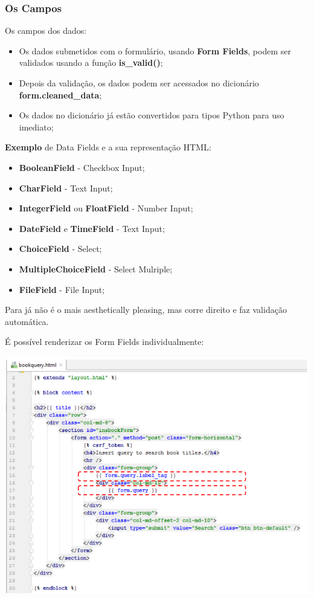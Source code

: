 \documentclass{article}
\begin{document}
\subsubsection*{Os Campos}

\begin{flushleft}
  Os campos dos dados:
  \begin{itemize}
    \item Os dados submetidos com o formulário, usando \textbf{Form Fields}, podem
    ser validados usando a função \textbf{is\_valid()};
    \item Depois da validação, os dados podem ser acessados no dicionário
    \textbf{form.cleaned\_data};
    \item Os dados no dicionário já estão convertidos para tipos Python para
    uso imediato;
  \end{itemize}

  \vspace{2mm}

  \textbf{Exemplo} de Data Fields e a sua representação HTML:
  \begin{itemize}
    \item \textbf{BooleanField} - Checkbox Input;
    \item \textbf{CharField} - Text Input;
    \item \textbf{IntegerField} ou \textbf{FloatField} - Number Input;
    \item \textbf{DateField} e \textbf{TimeField} - Text Input;
    \item \textbf{ChoiceField} - Select;
    \item \textbf{MultipleChoiceField} - Select Mulriple;
    \item \textbf{FileField} - File Input;
  \end{itemize}

  Para já não é o mais aesthetically pleasing, mas corre direito e faz
  validação automática.

  \pagebreak

  É possível renderizar os Form Fields individualmente:

  \begin{center}
    \includegraphics[scale=0.3]{21}
  \end{center}
\end{flushleft}
\end{document}
